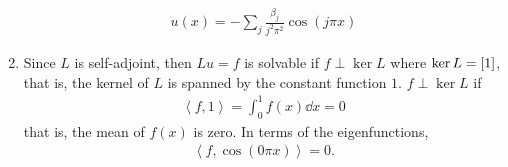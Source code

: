 \documentclass{article} %
\theoremstyle{plain}
\numberwithin{equation}{section} %
\numberwithin{figure}{section} %
\numberwithin{table}{section} %
\begin{document}
\begin{enumerate}[\ \ (a)]
\begin{align*}
            u(x) = -\sum_j \frac{\beta_j}{j^2\pi^2}\cos(j\pi x)
        \end{align*}
    \item
        Since $L$ is self-adjoint, then $Lu = f$ is solvable if $f \perp \ker L$ where $\ker L = \qty[1]$, that is, the kernel of $L$ is spanned by the constant function $1$.  $f \perp \ker L$ if
        \begin{align*}
            \left\langle f, 1\right\rangle = \int_0^1 f(x)\dd x = 0
        \end{align*}
        that is, the mean of $f(x)$ is zero.  In terms of the eigenfunctions,
        \begin{align*}
            \left\langle f, \cos(0\pi x)\right\rangle = 0.
        \end{align*}
\end{enumerate}
\end{document}
